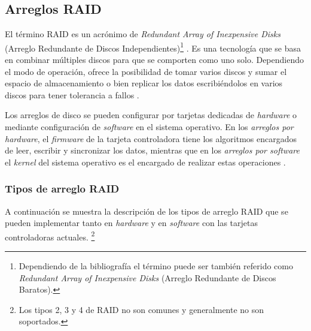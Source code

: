 \newpage
  \subsection {Arreglos RAID}
  \label{Arreglos-RAID}

El t\'{e}rmino \textsc{RAID} es un acr\'{o}nimo de \emph{Redundant Array of Inexpensive Disks} (Arreglo Redundante de Discos Independientes)\footnote{Dependiendo de la bibliograf\'{i}a el t\'{e}rmino puede ser tambi\'{e}n referido como \emph{Redundant Array of Inexpensive Disks} (Arreglo Redundante de Discos Baratos).} \cite{_bytepile.com_????}. Es una tecnolog\'{i}a que se basa en combinar m\'{u}ltiples discos para que se comporten como uno solo. Dependiendo el modo de operaci\'{o}n, ofrece la posibilidad de tomar varios discos y sumar el espacio de almacenamiento o bien replicar los datos escribi\'{e}ndolos en varios discos para tener tolerancia a fallos \cite{_raid_????-2}.

Los arreglos de disco se pueden configurar por tarjetas dedicadas de \textsl{hardware} o mediante configuraci\'{o}n de \textsl{software} en el sistema operativo. En los \emph{arreglos por \textsl{hardware}}, el \textsl{firmware} de la tarjeta controladora tiene los algoritmos encargados de leer, escribir y sincronizar los datos, mientras que en los \emph{arreglos por \textsl{software}} el \textsl{kernel} del sistema operativo es el encargado de realizar estas operaciones \cite{_chapter_????}.

\subsubsection*{Tipos de arreglo RAID}

A continuaci\'{o}n se muestra la descripci\'{o}n de los tipos de arreglo \textsc{RAID} que se pueden implementar tanto en \textit{hardware} y en \textit{software} con las tarjetas controladoras actuales. \footnote{Los tipos 2, 3 y 4 de \textsc{RAID} no son comunes y generalmente no son soportados.}

